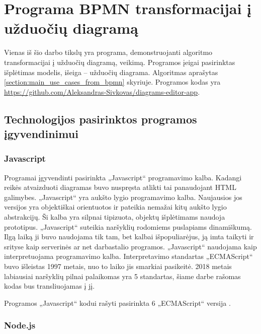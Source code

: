 \section{Programa BPMN transformacijai į užduočių diagramą}


Vienas iš šio darbo tikslų yra programa, demonstruojanti algoritmo \BPMN{} transformacijai į užduočių diagramą, veikimą. Programos įeigai pasirinktas \BPMN{} išplėtimas \DVCM{} modelis, išeiga – užduočių diagrama. Algoritmas aprašytas \ref{section:main_use_cases_from_bpmn} skyriuje. Programos kodas yra \href{https://github.com/Aleksandras-Sivkovas/diagrams-editor-app}{https://github.com/Aleksandras-Sivkovas/diagrams-editor-app}.

\subsection{Technologijos pasirinktos programos įgyvendinimui}

\subsubsection{Javascript}

Programai įgyvendinti pasirinkta „Javascript“ programavimo kalba. Kadangi reikės atvaizduoti diagramas buvo nuspręsta atlikti tai panaudojant HTML galimybes.  „Javascript“ yra aukšto lygio programavimo kalba. Naujausios jos versijos yra objektiškai orientuotos ir pateikia nemažai kitų aukšto lygio abstrakcijų. Ši kalba yra silpnai tipizuota, objektų išplėtimams naudoja prototipus. „Javascript“ suteikia naršyklių rodomiems puslapiams dinamiškumą. Ilgą laiką ji buvo naudojama tik tam, bet kalbai išpopuliarėjus, ją imta taikyti ir srityse kaip serverinės ar net darbastalio programos. „Javascript“ naudojama kaip interpretuojama programavimo kalba. Interpretavimo standartas „ECMAScript“ buvo išleistas 1997 metais, nuo to laiko jis smarkiai pasikeitė. 2018 metais labiausiai naršyklių pilnai palaikomas yra 5 standartas, šiame darbe rašomas kodas bus transliuojamas į jį.

Programos „Javascript“ kodui rašyti pasirinkta 6 „ECMAScript“ versija \cite{EcmaScript}.

\subsubsection{Node.js}

